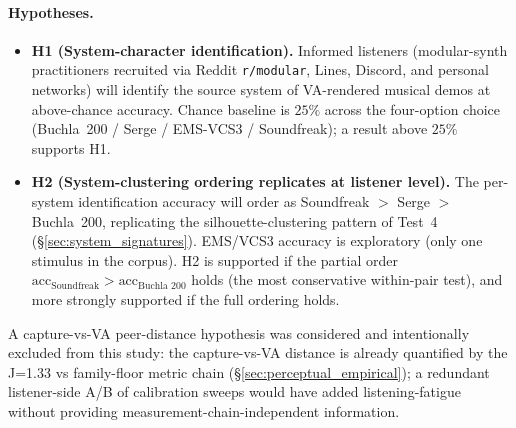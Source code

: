 \paragraph{Hypotheses.}
\begin{itemize}\itemsep0pt
    \item \textbf{H1 (System-character identification).} Informed listeners (modular-synth practitioners recruited via Reddit \texttt{r/modular}, Lines, Discord, and personal networks) will identify the source system of VA-rendered musical demos at above-chance accuracy. Chance baseline is $25\%$ across the four-option choice (Buchla~200 / Serge / EMS-VCS3 / Soundfreak); a result above $25\%$ supports H1.
    \item \textbf{H2 (System-clustering ordering replicates at listener level).} The per-system identification accuracy will order as Soundfreak $>$ Serge $>$ Buchla~200, replicating the silhouette-clustering pattern of Test~4 (\S\ref{sec:system_signatures}). EMS/VCS3 accuracy is exploratory (only one stimulus in the corpus). H2 is supported if the partial order $\text{acc}_\text{Soundfreak} > \text{acc}_\text{Buchla~200}$ holds (the most conservative within-pair test), and more strongly supported if the full ordering holds.
\end{itemize}
A capture-vs-VA peer-distance hypothesis was considered and intentionally excluded from this study: the capture-vs-VA distance is already quantified by the J=1.33 vs family-floor metric chain (\S\ref{sec:perceptual_empirical}); a redundant listener-side A/B of calibration sweeps would have added listening-fatigue without providing measurement-chain-independent information.

